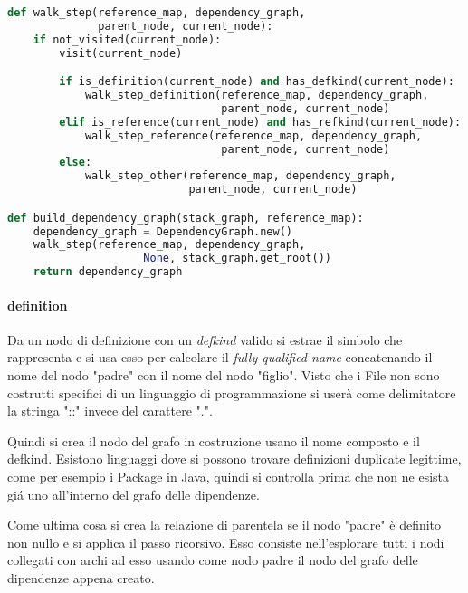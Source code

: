 \begin{lstlisting}[language=Python, caption=pseudocodice]
def walk_step(reference_map, dependency_graph,
              parent_node, current_node):
    if not_visited(current_node):
        visit(current_node)

        if is_definition(current_node) and has_defkind(current_node):
            walk_step_definition(reference_map, dependency_graph,
                                 parent_node, current_node)
        elif is_reference(current_node) and has_refkind(current_node):
            walk_step_reference(reference_map, dependency_graph,
                                 parent_node, current_node)
        else:
            walk_step_other(reference_map, dependency_graph,
                            parent_node, current_node)

def build_dependency_graph(stack_graph, reference_map):
    dependency_graph = DependencyGraph.new()
    walk_step(reference_map, dependency_graph,
                     None, stack_graph.get_root())
    return dependency_graph
\end{lstlisting}

\paragraph{definition}

Da un nodo di definizione con un \emph{defkind} valido si estrae il simbolo che rappresenta e si usa esso per calcolare il \emph{fully qualified name} concatenando il nome del nodo "padre" con il nome del nodo "figlio". Visto che i File non sono costrutti specifici di un linguaggio di programmazione si user\`a come delimitatore la stringa "::" invece del carattere ".".

Quindi si crea il nodo del grafo in costruzione usano il nome composto e il defkind. Esistono linguaggi dove si possono trovare definizioni duplicate legittime, come per esempio i Package in Java, quindi si controlla prima che non ne esista gi\'a uno all'interno del grafo delle dipendenze.

Come ultima cosa si crea la relazione di parentela se il nodo "padre" \`e definito non nullo e si applica il passo ricorsivo.
Esso consiste nell'esplorare tutti i nodi collegati con archi ad esso usando come nodo padre il nodo del grafo delle dipendenze appena creato.

